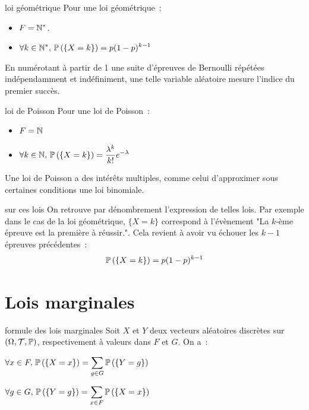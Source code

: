 \begin{exemple}{}{loi géométrique}
    Pour une loi géométrique~:
    \begin{itemize}
        \item $\displaystyle F = \mathbb{N}^*$.
        \item $\displaystyle \forall k \in \mathbb{N}^*,\, \mathbb{P}\left(\left\{X = k\right\}\right) = p (1-p)^{k-1}$
    \end{itemize}
    En numérotant à partir de 1 une suite d'épreuves de Bernoulli répétées indépendamment et indéfiniment, une telle variable aléatoire mesure l'indice du premier succès. 
\end{exemple}

\begin{exemple}{}{loi de Poisson}
    Pour une loi de Poisson~:
    \begin{itemize}
        \item $\displaystyle F = \mathbb{N}$
        \item $\displaystyle \forall k \in \mathbb{N},\, \mathbb{P}\left(\left\{X = k\right\}\right) = \frac{\lambda^k}{k!}e^{-\lambda}$
        
    \end{itemize}
    Une loi de Poisson a des intérêts multiples, comme celui d'approximer sous certaines conditions une loi binomiale.
\end{exemple}

\begin{remarque}{}{sur ces lois}
    On retrouve par dénombrement l'expression de telles lois. Par exemple dans le cas de la loi géométrique, $\{X = k\}$ correspond à l'évènement "La $k$-ème épreuve est la première à réussir.". Cela revient à avoir vu échouer les $k-1$ épreuves précédentes~:
    $$\mathbb{P}\left(\left\{X = k\right\}\right) = p (1-p)^{k-1}$$
\end{remarque}


\section{Lois marginales}

\begin{proposition}{}{formule des lois marginales}
    Soit $X$ et $Y$ deux vecteurs aléatoires discrètes sur $(\Omega, \mathcal{T}, \mathbb{P})$, respectivement à valeurs dans $F$ et $G$. On a~:
    \begin{enumeratebf}
        \item $\displaystyle \forall x \in F,\, \mathbb{P}\left(\left\{X=x\right\}\right) = \sum_{g \in G}\mathbb{P}\left(\left\{Y = g\right\}\right)$
        \item $\displaystyle \forall g \in G,\, \mathbb{P}\left(\left\{Y=g\right\}\right) = \sum_{x \in F}\mathbb{P}\left(\left\{X = x\right\}\right)$
    \end{enumeratebf}
\end{proposition}

